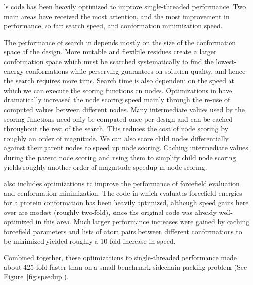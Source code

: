 's code has been heavily optimized to improve single-threaded performance. Two main areas have received the most attention, and the most improvement in performance, so far: \as search speed, and conformation minimization speed.

The performance of \as search in \osprey depends mostly on the size of the conformation space of the design. More mutable and flexibile residues create a larger conformation space which must be searched systematically to find the lowest-energy conformations while perserving guarantees on solution quality, and hence the search requires more time. Search time is also dependent on the speed at which we can execute the scoring functions on \as nodes. Optimizations in  have dramatically increased the \as node scoring speed mainly through the re-use of computed values between different nodes. Many intermediate values used by the \as scoring functions need only be computed once per design and can be cached throughout the rest of the search. This reduces the cost of node scoring by roughly an order of magnitude. We can also score child nodes differentially against their parent nodes to speed up node scoring. Caching intermediate values during the parent node scoring and using them to simplify child node scoring yields roughly another order of magnitude speedup in \as node scoring. %

 also includes optimizations to improve the performance of forcefield evaluation and conformation minimization. The code in  which evaluates forcefield energies for a protein conformation has been heavily optimized, although speed gains here over  are modest (roughly two-fold), since the original code was already well-optimized in this area. Much larger performance increases were gained by caching forcefield parameters and lists of atom pairs between different conformations to be minimized yielded roughly a 10-fold increase in speed. %

Combined together, these optimizations to single-threaded performance made  about 425-fold faster than  on a small benchmark sidechain packing problem (See Figure~\ref{fig:speedup}).

